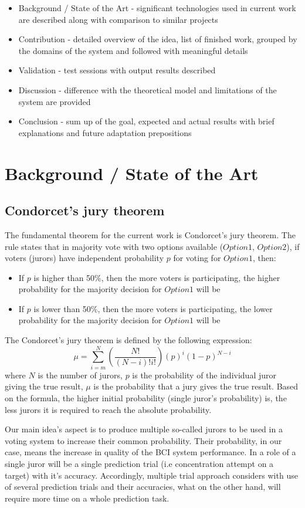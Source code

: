 \documentclass[12pt]{article}
\begin{document}
\begin{itemize}
\item Background / State of the Art - significant technologies used in current work are described along with comparison to similar projects
\item Contribution - detailed overview of the idea, list of finished work, grouped by the domains of the system and followed with meaningful details
\item Validation - test sessions with output results described
\item Discussion - difference with the theoretical model and limitations of the system are provided
\item Conclusion - sum up of the goal, expected and actual results with brief explanations and future adaptation prepositions
\end{itemize}

\newpage
\section{Background / State of the Art} 

\subsection{Condorcet's jury theorem}
The fundamental theorem for the current work is Condorcet's jury theorem. The rule states that in majority vote with two options available ($Option1$, $Option2$), if voters (jurors) have independent probability $p$ for voting for $Option1$, then:
\begin{itemize}
\item If $p$ is higher than 50\%, then the more voters is participating, the higher probability for the majority decision for $Option1$ will be
\item If $p$ is lower than 50\%, then the more voters is participating, the lower probability for the majority decision for $Option1$ will be
\end{itemize}
The Condorcet's jury theorem is defined by the following expression:
\[ \mu = \sum_{i=m}^{N} (\frac{N!}{(N-i)!i!})(p)^i(1-p)^{N-i} \]
where $N$ is the number of jurors, $p$ is the probability of the individual juror giving the true result, $\mu$ is the probability that a jury gives the true result.
Based on the formula, the higher initial probability (single juror's probability) is, the less jurors it is required to reach the absolute probability.

Our main idea's aspect is to produce multiple so-called jurors to be used in a voting system to increase their common probability. Their probability, in our case, means the increase in quality of the BCI system performance. In a role of a single juror will be a single prediction trial (i.e concentration attempt on a target) with it's accuracy. Accordingly, multiple trial approach considers with use of several prediction trials and their accuracies, what on the other hand, will require more time on a whole prediction task.
\end{document}
